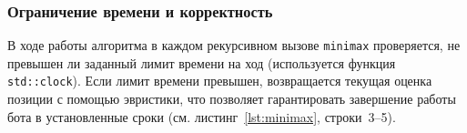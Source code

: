 \subsubsection*{Ограничение времени и корректность}

В ходе работы алгоритма в каждом рекурсивном вызове \lstinline|minimax| проверяется, не превышен ли заданный лимит времени на ход (используется функция \lstinline|std::clock|). Если лимит времени превышен, возвращается текущая оценка позиции с помощью эвристики, что позволяет гарантировать завершение работы бота в установленные сроки (см. листинг~\ref{lst:minimax}, строки~3--5).